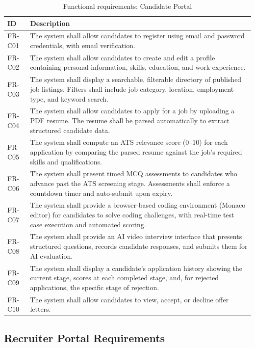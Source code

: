 \begin{table}[htbp]
\centering
\caption{Functional requirements: Candidate Portal}
\label{tab:fr-candidate}
\small
\begin{tabular}{p{0.8in}p{4.8in}}
\toprule
\textbf{ID} & \textbf{Description} \\
\midrule
FR-C01 & The system shall allow candidates to register using email and password credentials, with email verification. \\
FR-C02 & The system shall allow candidates to create and edit a profile containing personal information, skills, education, and work experience. \\
FR-C03 & The system shall display a searchable, filterable directory of published job listings. Filters shall include job category, location, employment type, and keyword search. \\
FR-C04 & The system shall allow candidates to apply for a job by uploading a PDF resume. The resume shall be parsed automatically to extract structured candidate data. \\
FR-C05 & The system shall compute an ATS relevance score (0--10) for each application by comparing the parsed resume against the job's required skills and qualifications. \\
FR-C06 & The system shall present timed MCQ assessments to candidates who advance past the ATS screening stage. Assessments shall enforce a countdown timer and auto-submit upon expiry. \\
FR-C07 & The system shall provide a browser-based coding environment (Monaco editor) for candidates to solve coding challenges, with real-time test case execution and automated scoring. \\
FR-C08 & The system shall provide an AI video interview interface that presents structured questions, records candidate responses, and submits them for AI evaluation. \\
FR-C09 & The system shall display a candidate's application history showing the current stage, scores at each completed stage, and, for rejected applications, the specific stage of rejection. \\
FR-C10 & The system shall allow candidates to view, accept, or decline offer letters. \\
\bottomrule
\end{tabular}
\end{table}

\subsection{Recruiter Portal Requirements}

